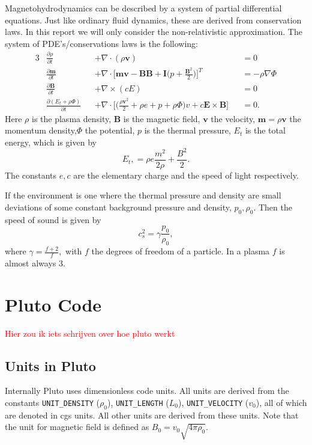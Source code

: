 \documentclass{article}
\begin{document}
Magnetohydrodynamics can be described by a system of partial differential equations. 
Just like ordinary fluid dynamics, these are derived from conservation laws. 
In this report we will only consider the non-relativistic approximation. 
The system of PDE's/conservations laws is the following:
\begin{alignat}{3}
    &\frac{\partial \rho}{\partial t} &&+ \nabla \cdot (\rho \mathbf v) &&= 0 \tag{mass}\label{masscont}\\
    &\frac{\partial \mathbf m}{\partial t} &&+  \nabla \cdot \bigg[\mathbf{mv - BB+ I}\bigg(p + \frac{\mathbf B^2}{2}\bigg)\bigg]^T &&= -\rho \nabla \Phi \tag{moment}\label{cauchymoment}\\
    &\frac{\partial \mathbf B}{\partial t} &&+ \nabla \times (cE) &&= 0 \tag{charge}\label{Faraday}\\
    &\frac{\partial(E_t + \rho \Phi)}{\partial t} &&+ \nabla \cdot \bigg[\bigg(\frac{\rho \mathbf v^2}{2} + \rho e + p + \rho \Phi\bigg)v + c \mathbf E \times \mathbf B\bigg] &&= 0 \tag{energy}\label{energy}.
\end{alignat}
Here $\rho$ is the plasma density, $\mathbf B$ is the magnetic field,  $\mathbf v$ the velocity, $\mathbf m= \rho \mathbf v$ the momentum density,$\Phi$ the potential, $p$ is the thermal pressure, $E_t$ is the total energy, which is given by \[
E_t, = \rho e \frac{m^2}{2\rho} + \frac{B^2}{2}
.\]  
The constants  $e, c$ are the elementary charge and the speed of light respectively.

If the environment is one where the thermal pressure and density are small deviations of some constant background pressure and density, $p_0, \rho_0$. Then the speed of sound is given by \[
c_s^2 = \gamma \frac{p_0}{\rho_0}
,\]
where $\gamma = \frac{f + 2}{f}, $ with $f$ the degrees of freedom of a particle. In a plasma $f$ is almost always $3$. 



\section{Pluto Code} \label{sec:pluto_code}

\textcolor{red}{Hier zou ik iets schrijven over hoe pluto werkt}

\subsection{Units in Pluto} \label{sec:units_in_pluto}

Internally Pluto uses dimensionless code units. All units are derived from the constants \texttt{UNIT\_DENSITY} ($\rho_0$), \texttt{UNIT\_LENGTH} ($L_0$), \texttt{UNIT\_VELOCITY} ($v_0$), all of which are denoted in cgs units. All other units are derived from these units.  
Note that the unit for magnetic field is defined as $B_0 = v_0\sqrt{4\pi \rho_0} $.
\end{document}
